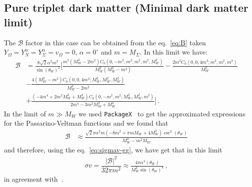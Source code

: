 \documentclass[12pt,letterpaper]{article}
\begin{document}
\subsection{Pure triplet dark matter (Minimal dark matter limit)}
\label{sec:pure-triplet-sigmagg}
The $\mathcal{B}$ factor in this case can be obtained from the eq.~\ref{eq:B} taken$Y_{\Omega}=Y_{N}^{\alpha}=Y_{\Sigma}^{\alpha}=v_{\Omega}=0$, $\alpha =0^{\circ}$ and $m=M_{\Sigma}$. In this limit we have:
%
\begin{align}
\mathcal{B} &=
\frac{8 \sqrt{2} \alpha ^2 m^2}{\sin(\theta_W)^2}
\bigg[
\frac{m^2 \left(M_W^2-2 m^2\right) C_0\left(0,-m^2,m^2;m^2,m^2,M_W^2\right)}{M_W^2 \left(M_W^2-m^2\right)}-\frac{2 m^2 C_0\left(0,0,4 m^2;m^2,m^2,m^2\right)}{M_W^2}\nonumber\\
&-\frac{4 \left(M_W^2-m^2\right) C_0\left(0,0,4
   m^2;M_W^2,M_W^2,M_W^2\right)}{M_W^2-2 m^2}\nonumber\\
   &+\frac{\left(-4 m^4+2 m^2 M_W^2+M_W^4\right) C_0\left(0,-m^2,m^2;M_W^2,M_W^2,m^2\right)}{2 m^4-3 m^2 M_W^2+M_W^4}
\bigg]\,.
\end{align}
In the limit of $m\gg M_W$ we used \texttt{PackageX}~\cite{Patel:2015tea} to get the approximated expressions for the Passarino-Veltman functions and we found that
\begin{align}
\mathcal{B} 
&\approx \frac{\sqrt{2} \pi  \alpha ^2 m \left(-8 m^2+\pi  m M_W+4 M_W^2\right) \csc ^2\left(\theta _W\right)}{M_W^3-m^2 M_W}
\end{align}
and therefore, using the eq.~\ref{eq:sigmav-gg}, we have get that in this limit
\begin{align}
\sigma v = \dfrac{|\mathcal{B}|^2}{32\pi m^2}\approx
\frac{4 \pi  \alpha ^4 \left(\theta _W\right)}{M_W^2 \sin(\theta_W)^4}\,,
\end{align}
in agreement with~\cite{Cirelli:2005uq}.











\end{document}
